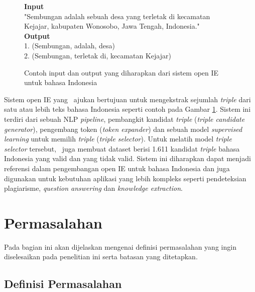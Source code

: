 \begin{figure}
	\begin{mdframed}
		\textbf{Input} \\
		"Sembungan adalah sebuah desa yang terletak di kecamatan Kejajar, kabupaten Wonosobo, Jawa Tengah, Indonesia." \\
		
		\textbf{Output} \\
		1. (Sembungan, adalah, desa) \\
		2. (Sembungan, terletak di, kecamatan Kejajar)
	\end{mdframed}
	\caption{Contoh input dan output yang diharapkan dari sistem open IE untuk bahasa Indonesia}
	\label{fig:example_io_openie}
\end{figure}

Sistem open IE yang \saya~ajukan bertujuan untuk mengekstrak sejumlah \textit{triple} dari satu atau lebih teks bahasa Indonesia seperti contoh pada Gambar \ref{fig:example_io_openie}. Sistem ini terdiri dari sebuah NLP \textit{pipeline}, pembangkit kandidat \textit{triple} (\textit{triple candidate generator}), pengembang token (\textit{token expander}) dan sebuah model \textit{supervised learning} untuk memilih \textit{triple} (\textit{triple selector}). Untuk melatih model \textit{triple selector} tersebut, \saya~juga membuat dataset berisi 1.611 kandidat \textit{triple} bahasa Indonesia yang valid dan yang tidak valid. Sistem ini diharapkan dapat menjadi referensi dalam pengembangan open IE untuk bahasa Indonesia dan juga digunakan untuk kebutuhan aplikasi yang lebih kompleks seperti pendeteksian plagiarisme, \textit{question answering} dan \textit{knowledge extraction}.

\section{Permasalahan}
Pada bagian ini akan dijelaskan mengenai definisi permasalahan yang ingin diselesaikan pada penelitian ini serta batasan yang ditetapkan.


\subsection{Definisi Permasalahan}

